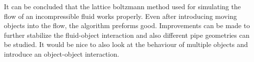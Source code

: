 It can be concluded that the lattice boltzmann method used for simulating the flow of an incompressible fluid works properly. Even after introducing moving objects into the flow, the algorithm preforms good. Improvements can be made to further stabilize the fluid-object interaction and also different pipe geometries can be studied. It would be nice to also look at the behaviour of multiple objects and introduce an object-object interaction.